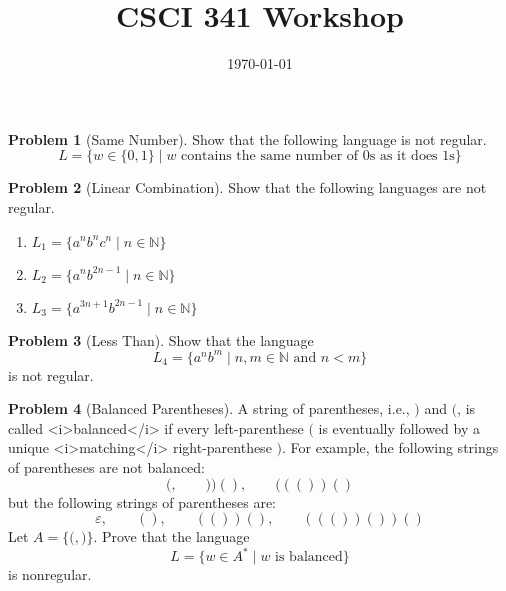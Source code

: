 \documentclass[11pt]{article}
\title{CSCI 341 Workshop \wshop}
\author{\subtitle}
\date{
    \today
}
\theoremstyle{theorem} %
\theoremstyle{definition} %
\newtheorem{problem}                    {{\color{BurntOrange}Problem}}
\theoremstyle{remark} %
\begin{document}
\maketitle



\begin{problem}[Same Number]
    Show that the following language is not regular.
    \[
        L = \{w \in \{0,1\} \mid \text{\(w\) contains the same number of \(0\)s as it does \(1\)s}\}
    \] 
\end{problem}

\vspace{20em}

\begin{problem}[Linear Combination]
    Show that the following languages are not regular. 
    \begin{enumerate}
        \item \(L_1 = \{a^nb^nc^n \mid n \in \mathbb N \}\)
        
        \pagebreak
        
        \item \(L_2 = \{a^nb^{2n - 1} \mid n \in \mathbb N \}\)
        \vspace{25em}
        
        \item \(L_3 = \{a^{3n+1}b^{2n - 1} \mid n \in \mathbb N \}\)
        
        \pagebreak

    \end{enumerate}
\end{problem}

\begin{problem}[Less Than]
    Show that the language
    \[L_4 = \{a^nb^m \mid n,m \in \mathbb N \text{ and } n < m\}\]
    is not regular.
\end{problem}

\vspace{15em}

\begin{problem}[Balanced Parentheses]
    A string of parentheses, i.e., \(\mathtt{)}\) and \(\mathtt{(}\), is called <i>balanced</i> if every left-parenthese \(\mathtt{(}\) is eventually followed by a unique <i>matching</i> right-parenthese \(\mathtt{)}\). 
    For example, the following strings of parentheses are not balanced:
    \[
        \mathtt{(},
        \qquad \mathtt{))()},
        \qquad \mathtt{((())()}
    \]
    but the following strings of parentheses are:
    \[
        \varepsilon,
        \qquad \mathtt{()},
        \qquad \mathtt{(())()},
        \qquad \mathtt{((())())()}
    \]
    Let \(A = \{\mathtt{(}, \mathtt{)}\}\). 
    Prove that the language 
    \[
        L = \{w \in A^* \mid \text{\(w\) is balanced}\}
    \]
    is nonregular.
\end{problem}
\end{document}
